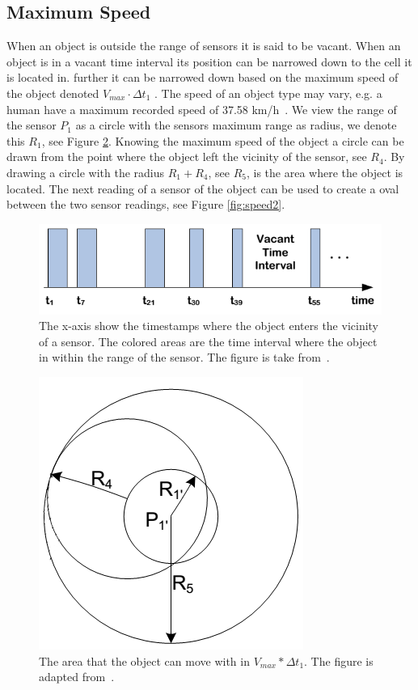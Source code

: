 \subsection{Maximum Speed}
\label{sec:speed}
When an object is outside the range of sensors it is said to be vacant.
When an object is in a vacant time interval its position can be narrowed down to the cell it is located in. 
further it can be narrowed down based on the maximum speed of the object denoted $V_{max}\cdot\Delta t_1$ . 
The speed of an object type may vary, e.g. a human have a maximum recorded speed of 37.58 km/h~\cite{bolt}.
We view the range of the sensor $P_1$ as a circle with the sensors maximum range as radius, we denote this $R_1$, see Figure \ref{fig:speed1}.
Knowing the maximum speed of the object a circle can be drawn from the point where the object left the vicinity of the sensor, see $R_4$.
By drawing a circle with the radius $R_1 + R_4$, see $R_5$, is the area where the object is located. 
The next reading of a sensor of the object can be used to create a oval between the two sensor readings, see Figure \ref{fig:speed2}.  

\begin{figure}%
\centering
\includegraphics[width=\columnwidth]{images/vacant.png}%
\caption{The x-axis show the timestamps where the object enters the vicinity of a sensor. The colored areas are the time interval where the object in within the range of the sensor. The figure is take from~\cite{Jensen:2009:GMB:1590953.1591000}.}%
\label{fig:vacant}%
\end{figure}

\begin{figure}%
\centering
\includegraphics[width=0.5\columnwidth]{images/speed.png}%
\caption{The area that the object can move with in $V_{max}*\Delta t_1$. The figure is adapted from~\cite{Jensen:2009:GMB:1590953.1591000}.}%
\label{fig:speed1}%
\end{figure}

